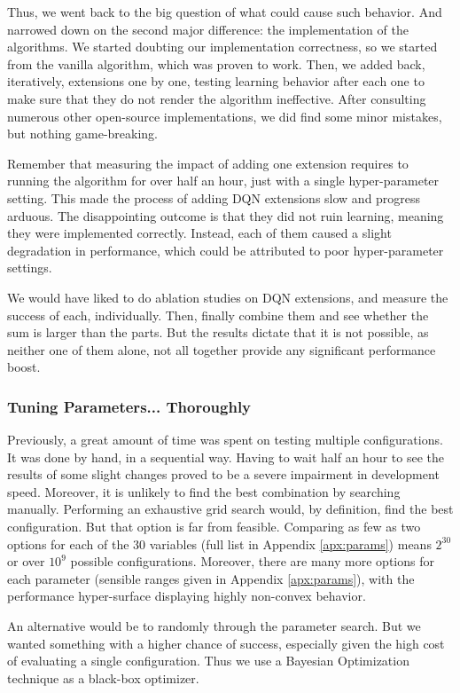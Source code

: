 \documentclass{article}
\begin{document}
Thus, we went back to the big question of what could cause such behavior. And narrowed down on the second major difference: the implementation of the algorithms. We started doubting our implementation correctness, so we started from the vanilla algorithm, which was proven to work. Then, we added back, iteratively, extensions one by one, testing learning behavior after each one to make sure that they do not render the algorithm ineffective. After consulting numerous other open-source implementations, we did find some minor mistakes, but nothing game-breaking. 

Remember that measuring the impact of adding one extension requires to running the algorithm for over half an hour, just with a single hyper-parameter setting. This made the process of adding DQN extensions slow and progress arduous. The disappointing outcome is that they did not ruin learning, meaning they were implemented correctly. Instead, each of them caused a slight degradation in performance, which could be attributed to poor hyper-parameter settings.

We would have liked to do ablation studies on DQN extensions, and measure the success of each, individually. Then, finally combine them and see whether the sum is larger than the parts. But the results dictate that it is not possible, as neither one of them alone, not all together provide any significant performance boost.

\subsubsection{Tuning Parameters... Thoroughly}

Previously, a great amount of time was spent on testing multiple configurations. It was done by hand, in a sequential way. Having to wait half an hour to see the results of some slight changes proved to be a severe impairment in development speed. Moreover, it is unlikely to find the best combination by searching manually. Performing an exhaustive grid search would, by definition, find the best configuration. But that option is far from feasible. Comparing as few as two options for each of the 30 variables (full list in Appendix \ref{apx:params}) means $2^30$ or over $10^9$ possible configurations. Moreover, there are many more options for each parameter (sensible ranges given in Appendix \ref{apx:params}), with the performance hyper-surface displaying highly non-convex behavior.

An alternative would be to randomly through the parameter search. But we wanted something with a higher chance of success, especially given the high cost of evaluating a single configuration. Thus we use a Bayesian Optimization technique as a black-box optimizer.
\end{document}
